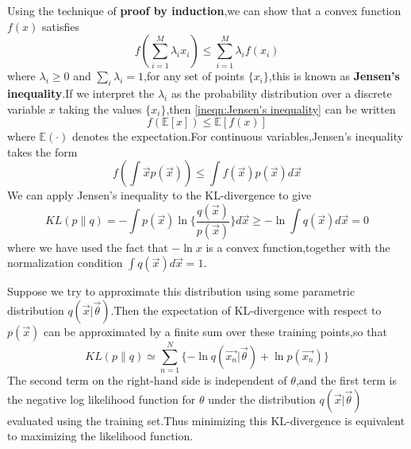 Using the technique of \textbf{proof by induction},we can show that a convex function $f(x)$ satisfies 
\begin{equation}\label{ineqn:Jensen's inequality}
f(\sum_{i=1}^{M}\lambda_i x_i) \leq \sum_{i=1}^{M}\lambda_i f(x_i)
\end{equation}
where $\lambda_i \geq 0$ and $\sum_{i}\lambda_i = 1$,for any set of points $\{x_i\}$,this is known as \textbf{Jensen's inequality}.If we interpret the $\lambda_i$ as the probability distribution over a discrete variable $x$ taking the values $\{x_i\}$,then \ref{ineqn:Jensen's inequality} can be written
\begin{equation}
f(\mathbb{E}[x]) \leq \mathbb{E}[f(x)]
\end{equation}
where $\mathbb{E}(\cdot)$ denotes the expectation.For continuous variables,Jensen's inequality takes the form
\begin{equation}
f(\int \vec{x}p(\vec{x})) \leq \int f(\vec{x})p(\vec{x})d\vec{x}
\end{equation}
We can apply Jensen's inequality to the KL-divergence to give
\begin{equation}
KL(p\parallel q) = -\int p(\vec{x}) \ln\{\dfrac{q(\vec{x})}{p(\vec{x})}\}d\vec{x} \geq -\ln \int q(\vec{x})d\vec{x} = 0
\end{equation}
where we have used the fact that $-\ln x$ is a convex function,together with the normalization condition $\int q(\vec{x})d\vec{x} = 1$.

Suppose we try to approximate this distribution using some parametric distribution $q(\vec{x}|\vec{\theta})$.Then the expectation of KL-divergence with respect to $p(\vec{x})$ can be approximated by a finite sum over these training points,so that
\begin{equation}
KL(p\parallel q) \simeq \sum_{n=1}^{N}\{-\ln q(\vec{x_n}|\vec{\theta}) + \ln p(\vec{x_n})\}
\end{equation}
The second term on the right-hand side is independent of $\theta$,and the first term is the negative log likelihood function for $\theta$ under the distribution $q(\vec{x}|\vec{\theta})$ evaluated using the training set.Thus minimizing this KL-divergence is equivalent to maximizing the likelihood function.


